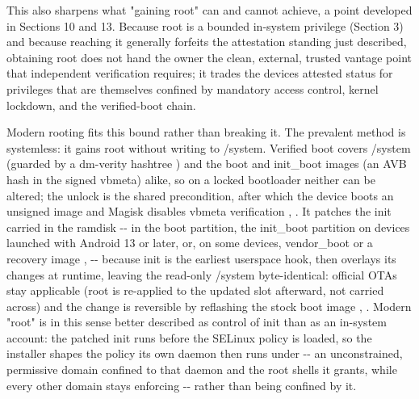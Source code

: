 \documentclass[
]{article}
\begin{document}
This also sharpens what "gaining root" can and cannot achieve, a point
developed in Sections 10 and 13. Because root is a bounded in-system
privilege (Section 3) and because reaching it generally forfeits the
attestation standing just described, obtaining root does not hand the
owner the clean, external, trusted vantage point that independent
verification requires; it trades the device\textquotesingle s attested
status for privileges that are themselves confined by mandatory access
control, kernel lockdown, and the verified-boot chain.

Modern rooting fits this bound rather than breaking it. The prevalent
method is systemless: it gains root without writing to /system. Verified
boot covers /system (guarded by a dm-verity hashtree
\citep{aosp-dm-verity}) and the boot and init\_boot images (an AVB hash
in the signed vbmeta) alike, so on a locked bootloader neither can be
altered; the unlock is the shared precondition, after which the device
boots an unsigned image and Magisk disables vbmeta verification
\citep{aosp-verified-boot}, \citep{magisk-install}. It patches the init
carried in the ramdisk -\/- in the boot partition, the init\_boot
partition on devices launched with Android 13 or later, or, on some
devices, vendor\_boot or a recovery image \citep{aosp-partitions},
\citep{magisk-install} -\/- because init is the earliest userspace hook,
then overlays its changes at runtime, leaving the read-only /system
byte-identical: official OTAs stay applicable (root is re-applied to the
updated slot afterward, not carried across) and the change is reversible
by reflashing the stock boot image \citep{magisk-install},
\citep{magisk-ota}. Modern "root" is in this sense better described as
control of init than as an in-system account: the patched init runs
before the SELinux policy is loaded, so the installer shapes the policy
its own daemon then runs under -\/- an unconstrained, permissive domain
confined to that daemon and the root shells it grants, while every other
domain stays enforcing \citep{magisk-details} -\/- rather than being
confined by it.
\end{document}
